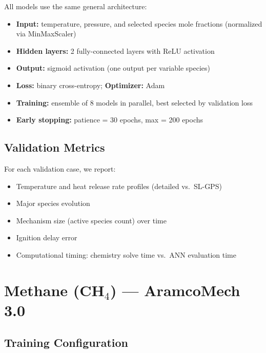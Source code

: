 \documentclass[11pt,a4paper]{article}
\begin{document}
All models use the same general architecture:
\begin{itemize}
    \item \textbf{Input:} temperature, pressure, and selected species mole fractions (normalized via MinMaxScaler)
    \item \textbf{Hidden layers:} 2 fully-connected layers with ReLU activation
    \item \textbf{Output:} sigmoid activation (one output per variable species)
    \item \textbf{Loss:} binary cross-entropy; \textbf{Optimizer:} Adam
    \item \textbf{Training:} ensemble of 8 models in parallel, best selected by validation loss
    \item \textbf{Early stopping:} patience = 30 epochs, max = 200 epochs
\end{itemize}

\subsection{Validation Metrics}

For each validation case, we report:
\begin{itemize}
    \item Temperature and heat release rate profiles (detailed vs.\ SL-GPS)
    \item Major species evolution
    \item Mechanism size (active species count) over time
    \item Ignition delay error
    \item Computational timing: chemistry solve time vs.\ ANN evaluation time
\end{itemize}

\newpage
\section{Methane (CH\texorpdfstring{$_4$}{4}) --- AramcoMech 3.0}
\label{sec:ch4}

\subsection{Training Configuration}
\end{document}
